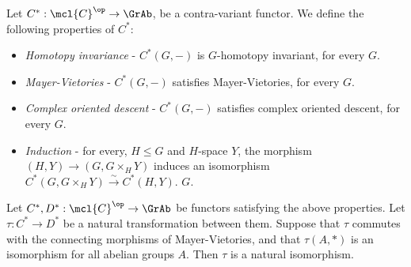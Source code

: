 \begin{definition}
	Let $C^*: \mcl{C}^\op \to \GrAb$, be a contra-variant functor.
	We define the following properties of $C^*$:
	\begin{itemize}
		\item \emph{Homotopy invariance} - $C^*\left(G, -\right)$ is $G$-homotopy invariant, for every $G$.
		\item \emph{Mayer-Vietories} - $C^*\left(G, -\right)$ satisfies Mayer-Vietories, for every $G$.
		\item \emph{Complex oriented descent} - $C^*\left(G, -\right)$ satisfies complex oriented descent, for every $G$.
		\item \emph{Induction} - for every, $H \leq G$ and $H$-space $Y$, the morphism $\left(H, Y\right) \to \left(G, G \times_H Y\right)$ induces an isomorphism $C^*\left(G, G \times_H Y\right) \xrightarrow{\sim} C^*\left(H, Y\right)$. $G$.
	\end{itemize}
\end{definition}

\begin{theorem}\label{cmplx-oriented-natural-transformation}
	Let $C^*, D^*: \mcl{C}^\op \to \GrAb$ be functors satisfying the above properties.
	Let $\tau: C^* \to D^*$ be a natural transformation between them.
	Suppose that $\tau$ commutes with the connecting morphisms of Mayer-Vietories, and that $\tau\left(A, *\right)$ is an isomorphism for all abelian groups $A$.
	Then $\tau$ is a natural isomorphism.
\end{theorem}

